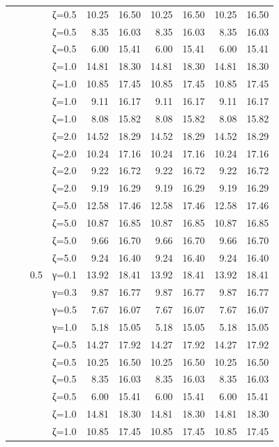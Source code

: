 \begin{table}[htbp]
\begin{tabular}{ll r l  rr  rr  rr}
  &  &  & ζ=0.5 & 10.25 & 16.50 & 10.25 & 16.50 & 10.25 & 16.50 \\
  &  &  & ζ=0.5 & 8.35 & 16.03 & 8.35 & 16.03 & 8.35 & 16.03 \\
  &  &  & ζ=0.5 & 6.00 & 15.41 & 6.00 & 15.41 & 6.00 & 15.41 \\
  &  &  & ζ=1.0 & 14.81 & 18.30 & 14.81 & 18.30 & 14.81 & 18.30 \\
  &  &  & ζ=1.0 & 10.85 & 17.45 & 10.85 & 17.45 & 10.85 & 17.45 \\
  &  &  & ζ=1.0 & 9.11 & 16.17 & 9.11 & 16.17 & 9.11 & 16.17 \\
  &  &  & ζ=1.0 & 8.08 & 15.82 & 8.08 & 15.82 & 8.08 & 15.82 \\
  &  &  & ζ=2.0 & 14.52 & 18.29 & 14.52 & 18.29 & 14.52 & 18.29 \\
  &  &  & ζ=2.0 & 10.24 & 17.16 & 10.24 & 17.16 & 10.24 & 17.16 \\
  &  &  & ζ=2.0 & 9.22 & 16.72 & 9.22 & 16.72 & 9.22 & 16.72 \\
  &  &  & ζ=2.0 & 9.19 & 16.29 & 9.19 & 16.29 & 9.19 & 16.29 \\
  &  &  & ζ=5.0 & 12.58 & 17.46 & 12.58 & 17.46 & 12.58 & 17.46 \\
  &  &  & ζ=5.0 & 10.87 & 16.85 & 10.87 & 16.85 & 10.87 & 16.85 \\
  &  &  & ζ=5.0 & 9.66 & 16.70 & 9.66 & 16.70 & 9.66 & 16.70 \\
  &  &  & ζ=5.0 & 9.24 & 16.40 & 9.24 & 16.40 & 9.24 & 16.40 \\
  &  & 0.5 & γ=0.1 & 13.92 & 18.41 & 13.92 & 18.41 & 13.92 & 18.41 \\
  &  &  & γ=0.3 & 9.87 & 16.77 & 9.87 & 16.77 & 9.87 & 16.77 \\
  &  &  & γ=0.5 & 7.67 & 16.07 & 7.67 & 16.07 & 7.67 & 16.07 \\
  &  &  & γ=1.0 & 5.18 & 15.05 & 5.18 & 15.05 & 5.18 & 15.05 \\
  &  &  & ζ=0.5 & 14.27 & 17.92 & 14.27 & 17.92 & 14.27 & 17.92 \\
  &  &  & ζ=0.5 & 10.25 & 16.50 & 10.25 & 16.50 & 10.25 & 16.50 \\
  &  &  & ζ=0.5 & 8.35 & 16.03 & 8.35 & 16.03 & 8.35 & 16.03 \\
  &  &  & ζ=0.5 & 6.00 & 15.41 & 6.00 & 15.41 & 6.00 & 15.41 \\
  &  &  & ζ=1.0 & 14.81 & 18.30 & 14.81 & 18.30 & 14.81 & 18.30 \\
  &  &  & ζ=1.0 & 10.85 & 17.45 & 10.85 & 17.45 & 10.85 & 17.45 \\

\end{tabular}
\end{table}
